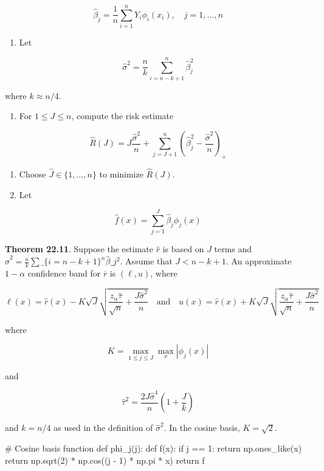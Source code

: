 \[ \hat{\beta}_{j} = \frac{1}{n} \sum_{i=1}^{n} Y_{i} \phi_{i}(x_{i}), \quad j = 1, \dots, n\]

\begin{enumerate}[tightlist,label={\arabic*.}]
\item
  Let
\end{enumerate}

\[ \hat{\sigma}^{2} = \frac{n}{k} \sum_{i=n-k+1}^{n} \hat{\beta}_{j}^{2} \]

where \(k \approx n / 4\).

\begin{enumerate}[tightlist,label={\arabic*.},resume]
\item
  For \(1 \leq J \leq n\), compute the risk estimate
\end{enumerate}

\[ \hat{R}(J) = J \frac{\hat{\sigma}^{2}}{n} + \sum_{j=J+1}^{n} \left(\hat{\beta}_{j}^{2} - \frac{\hat{\sigma}^{2}}{n} \right)_{+} \]

\begin{enumerate}
\def\labelenumi{\arabic{enumi}.}
\setcounter{enumi}{3}
\item
  Choose \(\hat{J} \in \{1, \dots, n \}\) to minimize \(\hat{R}(J)\).
\item
  Let
\end{enumerate}

\[ \hat{f}(x) = \sum_{j=1}^J \hat{\beta}_{j} \phi_{j}(x) \]

\textbf{Theorem 22.11}. Suppose the estimate \(\hat{r}\) is based on
\(J\) terms and $\hat{\sigma}^{2} = \frac{n}{k} \sum\_\{i=n-k+1\}^{n}
\hat{\beta}\_{j}^{2} $. Assume that \(J < n - k + 1\). An approximate
\(1 - \alpha\) confidence band for \(\overline{r}\) is \((\ell, u)\),
where

\[ \ell(x) = \hat{r}(x) - K \sqrt{J} \sqrt{\frac{z_{\alpha} \hat{\tau}}{\sqrt{n}} + \frac{J \hat{\sigma}^{2}}{n}}
\quad \text{and} \quad u(x) = \hat{r}(x) + K \sqrt{J} \sqrt{\frac{z_{\alpha} \hat{\tau}}{\sqrt{n}} + \frac{J \hat{\sigma}^{2}}{n}} \]

where

\[ K = \max_{1 \leq j \leq J} \max_x | \phi_{j}(x) | \]

and

\[ \hat{\tau}^{2} = \frac{2 J \hat{\sigma}^{4}}{n} \left( 1 + \frac{J}{k} \right) \]

and \(k = n / 4\) as used in the definition of \(\hat{\sigma}^{2}\). In
the cosine basis, \(K = \sqrt{2}\).

\begin{python}
# Cosine basis function
def phi_{j}(j):
    def f(x):
        if j == 1:
            return np.ones_like(x)
        return np.sqrt(2) * np.cos((j - 1) * np.pi * x)
    return f
\end{python}

